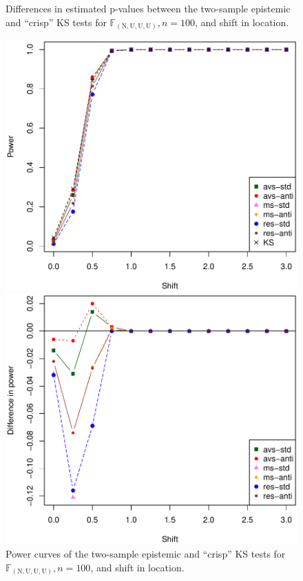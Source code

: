 \begin{figure}[htb]
\begin{minipage}[t]{0.45\linewidth}
	\caption{Differences in estimated p-values between the two-sample epistemic and ``crisp'' KS tests for $\mathbb{F}_{(\mathrm{N,U,U,U})}, n=100$, and shift in location.}
	\label{figN100pvalue2}
	\end{minipage}  
\end{figure}

\begin{figure}[htb]
  \centering
	\begin{minipage}[t]{0.45\linewidth}
	\vspace{0pt}
	\includegraphics[scale=0.42]{power_N100_rys01.pdf}
	\caption{Power curves of the two-sample epistemic and ``crisp'' KS tests for $\mathbb{F}_{(\mathrm{N,U,U,U})}, n=100$, and shift in location.}
	\label{figN100power1}
	\end{minipage}  
\hfill
\begin{minipage}[t]{0.45\linewidth}
\vspace{0pt}
	\includegraphics[scale=0.42]{diff_power_N100_rys01.pdf}

\end{minipage}
\end{figure}
